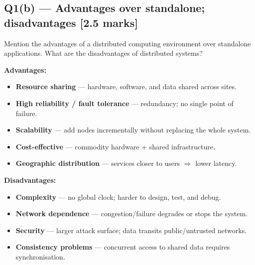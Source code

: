 \documentclass[12pt, a4paper]{article}
\newenvironment{qbox}{\begin{mdframed}[style=qframe]}{\end{mdframed}}
\newenvironment{solbox}{\begin{mdframed}[style=solframe]}{\end{mdframed}}
\newcommand{\qmarks}[1]{\hfill\textbf{\color{orange!70!black}[#1 marks]}}
\begin{document}
\subsection{Q1(b) — Advantages over standalone; disadvantages \texorpdfstring{\qmarks{2.5}}{}}
\begin{qbox}Mention the advantages of a distributed computing environment over standalone applications. What are the disadvantages of distributed systems?\end{qbox}
\begin{solbox}
\textbf{Advantages:}
\begin{itemize}[leftmargin=1.4cm, itemsep=2pt]
  \item \textbf{Resource sharing} — hardware, software, and data shared across sites.
  \item \textbf{High reliability / fault tolerance} — redundancy; no single point of failure.
  \item \textbf{Scalability} — add nodes incrementally without replacing the whole system.
  \item \textbf{Cost-effective} — commodity hardware + shared infrastructure.
  \item \textbf{Geographic distribution} — services closer to users $\Rightarrow$ lower latency.
\end{itemize}
\textbf{Disadvantages:}
\begin{itemize}[leftmargin=1.4cm, itemsep=2pt]
  \item \textbf{Complexity} — no global clock; harder to design, test, and debug.
  \item \textbf{Network dependence} — congestion/failure degrades or stops the system.
  \item \textbf{Security} — larger attack surface; data transits public/untrusted networks.
  \item \textbf{Consistency problems} — concurrent access to shared data requires synchronisation.
\end{itemize}
\end{solbox}

\end{document}
